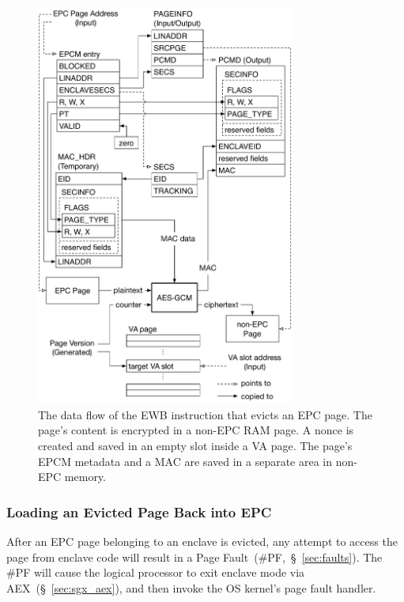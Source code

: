 \begin{figure}[hbt]
  \centering
  \includegraphics[width=85mm]{figures/sgx_ewb.pdf}
  \caption{
    The data flow of the EWB instruction that evicts an EPC page. The page's
    content is encrypted in a non-EPC RAM page. A nonce is created and saved
    in an empty slot inside a VA page. The page's EPCM metadata and a MAC
    are saved in a separate area in non-EPC memory.
  }
  \label{fig:sgx_ewb}
\end{figure}



\subsubsection{Loading an Evicted Page Back into EPC}


After an EPC page belonging to an enclave is evicted, any attempt to access the
page from enclave code will result in a Page Fault~(\#PF,~\S~\ref{sec:faults}).
The \#PF will cause the logical processor to exit enclave mode via
AEX~(\S~\ref{sec:sgx_aex}), and then invoke the OS kernel's page fault handler.


